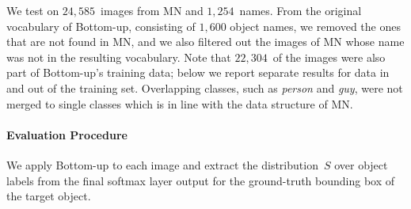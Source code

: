 We test on $24,585$~images from MN and $1,254$~names.
From the original vocabulary of Bottom-up, consisting of $1,600$ object names, we removed the ones that are not found in MN, and we also filtered out the images of MN whose \vg name was not in the resulting vocabulary.
Note that $22,304$~of the images were also part of Bottom-up's training data; below we report separate results for data in and out of the training set.
Overlapping classes, such as \textsl{person} and \textsl{guy}, were not merged to single classes which is in line with the data structure of MN.

\paragraph{Evaluation Procedure}
We apply Bottom-up to each image and extract the distribution~$S$ over object labels from the final softmax layer output for the ground-truth bounding box of the target object. 

